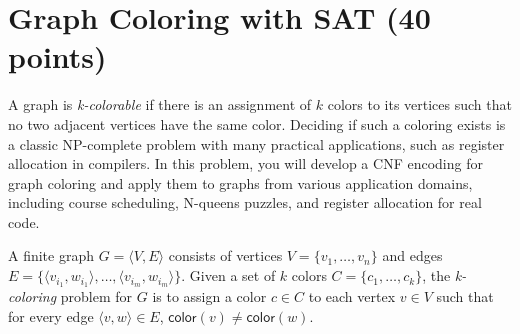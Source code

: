 \documentclass{article}
\begin{document}
\section{Graph Coloring with SAT (40 points)}\label{coloring}

A graph is \emph{k-colorable} if there is an assignment of $k$ colors to its vertices such that no two adjacent vertices have the same color.  Deciding if such a coloring exists is a classic NP-complete problem with many practical applications, such as register allocation in compilers.  In this problem, you will develop a CNF encoding for graph coloring and apply them to graphs from various application domains, including course scheduling, N-queens puzzles, and register allocation for real code.

A finite graph $G = \langle V, E\rangle$ consists of vertices $V=\{v_1,\ldots,v_n\}$ and edges $E=\{\langle v_{i_1}, w_{i_1}\rangle,\ldots,\langle v_{i_m}, w_{i_m}\rangle\}$.  Given a set of $k$ colors $C=\{c_1,\ldots,c_k\}$, the \emph{k-coloring} problem for $G$ is to assign a color $c\in C$  to each vertex $v\in V$ such that for every edge $\langle v,w\rangle\in E$, $\mathsf{color}(v)\neq\mathsf{color}(w)$.
\end{document}
